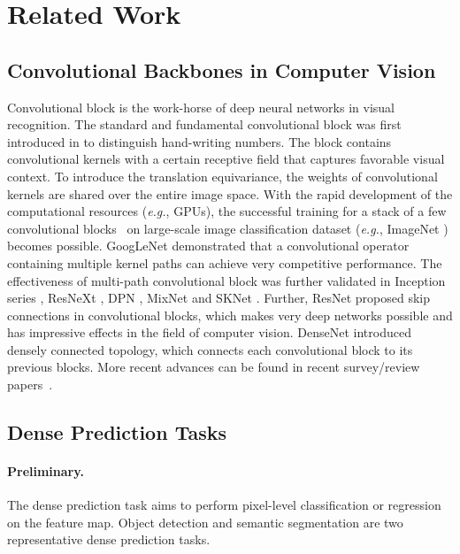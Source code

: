 \documentclass[10pt,twocolumn,letterpaper]{article}
\def\eg{\emph{e.g.}}
\begin{document}
\section{Related Work}

\subsection{Convolutional Backbones in Computer Vision}
Convolutional block is the work-horse of deep neural networks in visual recognition. The standard and fundamental convolutional block was first introduced in \cite{lecun1998gradient} to distinguish hand-writing numbers. The block contains convolutional kernels with a certain receptive field that captures favorable visual context. To introduce the translation equivariance, the weights of convolutional kernels are shared over the entire image space. With the rapid development of the computational resources (\eg, GPUs), the successful training for a stack of a few convolutional blocks~\cite{krizhevsky2012imagenet,simonyan2014very} on large-scale image classification dataset (\eg, ImageNet \cite{russakovsky2015imagenet}) becomes possible. GoogLeNet \cite{szegedy2015going} demonstrated that a convolutional operator containing multiple kernel paths can achieve very competitive performance. 
The effectiveness of multi-path convolutional block was further validated in Inception series \cite{szegedy2016rethinking,szegedy2017inception}, ResNeXt \cite{xie2017aggregated}, DPN \cite{chen2017dual}, MixNet \cite{wang2018mixed} and SKNet \cite{li2019selective}.
Further, ResNet \cite{he2016deep} proposed skip connections in convolutional blocks, which makes very deep networks possible and has impressive effects in the field of computer vision.
DenseNet \cite{huang2017densely} introduced densely connected topology, which connects each convolutional block to its previous blocks. 
More recent advances can be found in recent survey/review papers~\cite{khan2020survey,shorten2019survey}.

\subsection{Dense Prediction Tasks}
\paragraph{Preliminary.} The dense prediction task aims to perform pixel-level classification or regression on the feature map.
Object detection and semantic segmentation are two representative dense prediction tasks.
\end{document}
